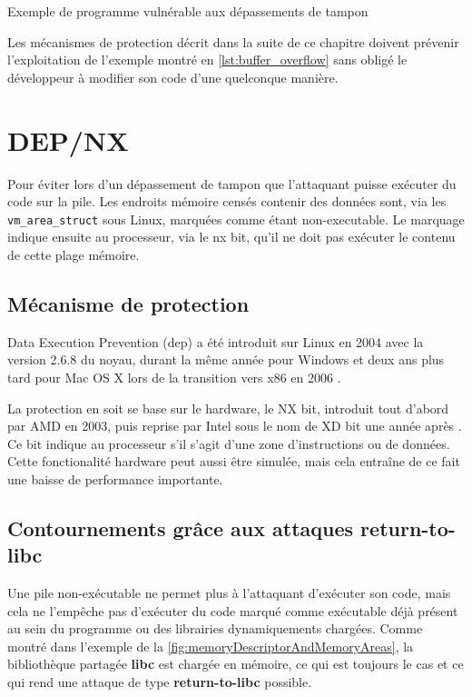 \begin{listing}
	\caption{Exemple de programme vulnérable aux dépassements de tampon}
	\label{lst:buffer_overflow}
\end{listing}

Les mécanismes de protection décrit dans la suite de ce chapitre doivent prévenir l'exploitation de l'exemple montré en \autoref{lst:buffer_overflow} sans obligé le développeur à modifier son code d'une quelconque manière.


\vfill

\section{DEP/NX}

Pour éviter lors d'un dépassement de tampon que l'attaquant puisse exécuter du code sur la pile. Les endroits mémoire censés contenir des données sont, via les \texttt{vm_area_struct} sous Linux, marquées comme étant non-executable. Le marquage indique ensuite au processeur, via le \gls{nx} bit, qu'il ne doit pas exécuter le contenu de cette plage mémoire.

\subsection{Mécanisme de protection}

Data Execution Prevention (\gls{dep}) a été introduit sur Linux en 2004 avec la version 2.6.8 du noyau, durant la même année pour Windows et deux ans plus tard pour Mac OS X lors de la transition vers x86 en 2006 \cite{DataExecutionPrevention}.

La protection en soit se base sur le hardware, le NX bit, introduit tout d'abord par AMD en 2003, puis reprise par Intel sous le nom de XD bit une année après \cite{ExecutableSpaceProtection} \cite{NXBit}. Ce bit indique au processeur s'il s'agit d'une zone d'instructions ou de données. Cette fonctionalité hardware peut aussi être simulée, mais cela entraîne de ce fait une baisse de performance importante.

\subsection{Contournements grâce aux attaques \og return-to-libc \fg}

Une pile non-exécutable ne permet plus à l'attaquant d'exécuter son code, mais cela ne l'empêche pas d'exécuter du code marqué comme exécutable déjà présent au sein du programme ou des librairies dynamiquements chargées. Comme montré dans l'exemple de la \autoref{fig:memoryDescriptorAndMemoryAreas}, la bibliothèque partagée \textbf{libc} est chargée en mémoire, ce qui est toujours le cas et ce qui rend une attaque de type \textbf{\og return-to-libc \fg} \cite{ReturntolibcAttack} possible.

